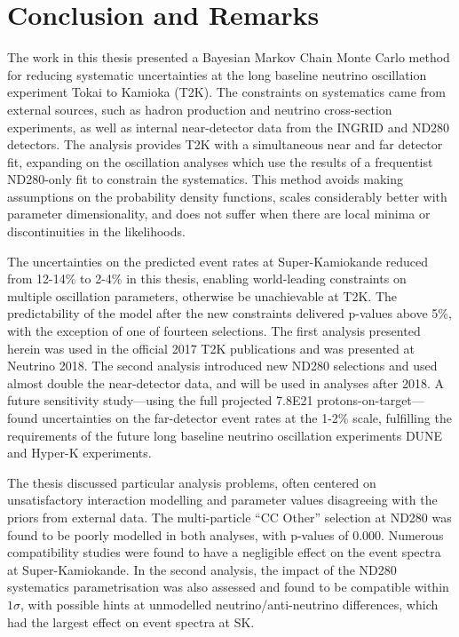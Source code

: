 \chapter{Conclusion and Remarks}
\label{chap:conclusion}
The work in this thesis presented a Bayesian Markov Chain Monte Carlo method for reducing systematic uncertainties at the long baseline neutrino oscillation experiment Tokai to Kamioka (T2K). The constraints on systematics came from external sources, such as hadron production and neutrino cross-section experiments, as well as internal near-detector data from the INGRID and ND280 detectors. The analysis provides T2K with a simultaneous near and far detector fit, expanding on the oscillation analyses which use the results of a frequentist ND280-only fit to constrain the systematics. This method avoids making assumptions on the probability density functions, scales considerably better with parameter dimensionality, and does not suffer when there are local minima or discontinuities in the likelihoods.

The uncertainties on the predicted event rates at Super-Kamiokande reduced from 12-14\% to 2-4\% in this thesis, enabling world-leading constraints on multiple oscillation parameters, otherwise be unachievable at T2K. The predictability of the model after the new constraints delivered p-values above 5\%, with the exception of one of fourteen selections. The first analysis presented herein was used in the official 2017 T2K publications and was presented at Neutrino 2018. The second analysis introduced new ND280 selections and used almost double the near-detector data, and will be used in analyses after 2018. A future sensitivity study---using the full projected 7.8E21 protons-on-target---found uncertainties on the far-detector event rates at the 1-2\% scale, fulfilling the requirements of the future long baseline neutrino oscillation experiments DUNE and Hyper-K experiments.

The thesis discussed particular analysis problems, often centered on unsatisfactory interaction modelling and parameter values disagreeing with the priors from external data. The multi-particle ``CC Other'' selection at ND280 was found to be poorly modelled in both analyses, with p-values of 0.000. Numerous compatibility studies were found to have a negligible effect on the event spectra at Super-Kamiokande. In the second analysis, the impact of the ND280 systematics parametrisation was also assessed and found to be compatible within $1\sigma$, with possible hints at unmodelled neutrino/anti-neutrino differences, which had the largest effect on event spectra at SK.

